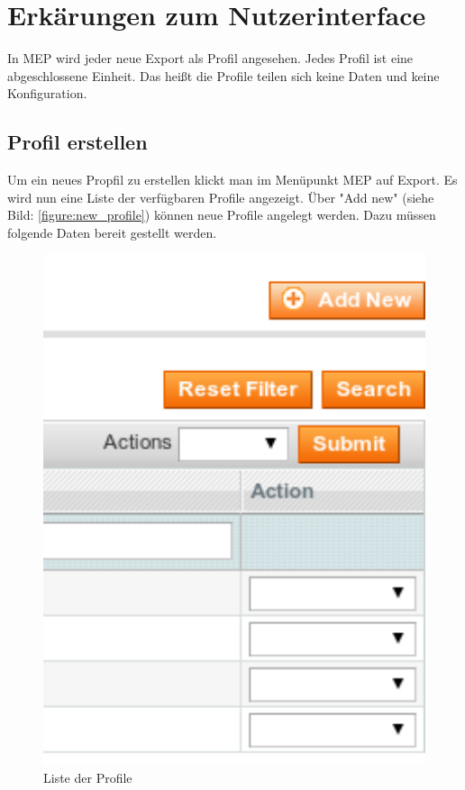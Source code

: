 \documentclass[a4paper,12pt]{book}
\begin{document}
\chapter{Erkärungen zum Nutzerinterface}
In MEP wird jeder neue Export als Profil angesehen. Jedes Profil ist
eine abgeschlossene Einheit. Das heißt die Profile teilen sich keine
Daten und keine Konfiguration.

\section{Profil erstellen}
Um ein neues Propfil zu erstellen klickt man im Menüpunkt MEP auf
Export. Es wird nun eine Liste der verfügbaren
Profile angezeigt. Über "Add new" (siehe Bild: \ref{figure:new_profile}) 
können neue Profile angelegt werden. Dazu müssen folgende Daten 
bereit gestellt werden.

\begin{figure}
 \includegraphics[width=1\textwidth]{img/bild02.png}
  \caption{Liste der Profile}
  \label{figure:profile_list}
\end{figure}
\end{document}
